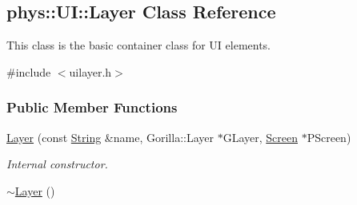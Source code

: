 \hypertarget{classphys_1_1UI_1_1Layer}{
\subsection{phys::UI::Layer Class Reference}
\label{dd/d5b/classphys_1_1UI_1_1Layer}
}


This class is the basic container class for UI elements.  




{\ttfamily \#include $<$uilayer.h$>$}

\subsubsection*{Public Member Functions}
\begin{DoxyCompactItemize}
\item 
\hyperlink{classphys_1_1UI_1_1Layer_a26fd46d043fa1786a543b4c6b3863643}{Layer} (const \hyperlink{namespacephys_aa03900411993de7fbfec4789bc1d392e}{String} \&name, Gorilla::Layer $\ast$GLayer, \hyperlink{classphys_1_1UI_1_1Screen}{Screen} $\ast$PScreen)
\begin{DoxyCompactList}\small\item\em Internal constructor. \item\end{DoxyCompactList}\item 
\hypertarget{classphys_1_1UI_1_1Layer_a02f12501f3efbb5b06d59bfc04fab50d}{
\hyperlink{classphys_1_1UI_1_1Layer_a02f12501f3efbb5b06d59bfc04fab50d}{$\sim$Layer} ()}
\label{dd/d5b/classphys_1_1UI_1_1Layer_a02f12501f3efbb5b06d59bfc04fab50d}


\end{DoxyCompactItemize}
